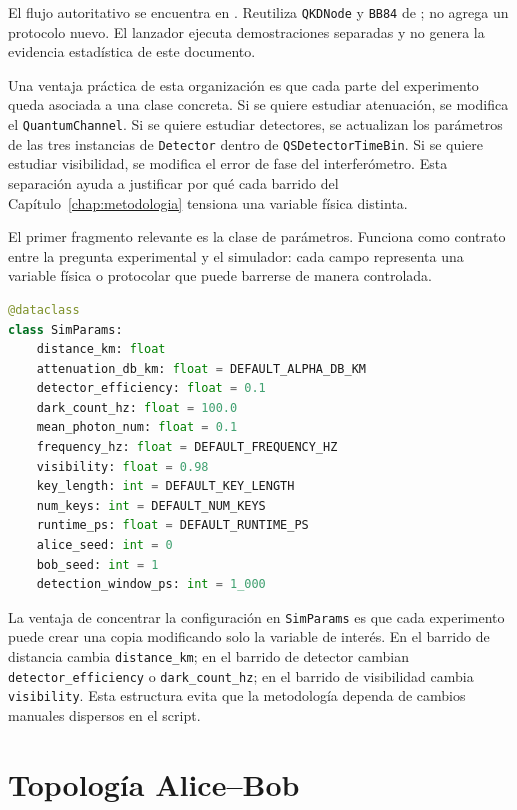 El flujo autoritativo se encuentra en . Reutiliza \texttt{QKDNode} y \texttt{BB84} de ; no agrega un protocolo nuevo. El lanzador  ejecuta demostraciones separadas y no genera la evidencia estadística de este documento.

Una ventaja práctica de esta organización es que cada parte del experimento queda asociada a una clase concreta. Si se quiere estudiar atenuación, se modifica el \texttt{QuantumChannel}. Si se quiere estudiar detectores, se actualizan los parámetros de las tres instancias de \texttt{Detector} dentro de \texttt{QSDetectorTimeBin}. Si se quiere estudiar visibilidad, se modifica el error de fase del interferómetro. Esta separación ayuda a justificar por qué cada barrido del Capítulo~\ref{chap:metodologia} tensiona una variable física distinta.

El primer fragmento relevante es la clase de parámetros. Funciona como contrato entre la pregunta experimental y el simulador: cada campo representa una variable física o protocolar que puede barrerse de manera controlada.

\begin{lstlisting}[language=Python, caption={Parámetros centrales del experimento.}, label={lst:simparams_cap6}]
@dataclass
class SimParams:
    distance_km: float
    attenuation_db_km: float = DEFAULT_ALPHA_DB_KM
    detector_efficiency: float = 0.1
    dark_count_hz: float = 100.0
    mean_photon_num: float = 0.1
    frequency_hz: float = DEFAULT_FREQUENCY_HZ
    visibility: float = 0.98
    key_length: int = DEFAULT_KEY_LENGTH
    num_keys: int = DEFAULT_NUM_KEYS
    runtime_ps: float = DEFAULT_RUNTIME_PS
    alice_seed: int = 0
    bob_seed: int = 1
    detection_window_ps: int = 1_000
\end{lstlisting}

La ventaja de concentrar la configuración en \texttt{SimParams} es que cada experimento puede crear una copia modificando solo la variable de interés. En el barrido de distancia cambia \texttt{distance\_km}; en el barrido de detector cambian \texttt{detector\_efficiency} o \texttt{dark\_count\_hz}; en el barrido de visibilidad cambia \texttt{visibility}. Esta estructura evita que la metodología dependa de cambios manuales dispersos en el script.

\section{Topología Alice--Bob}

